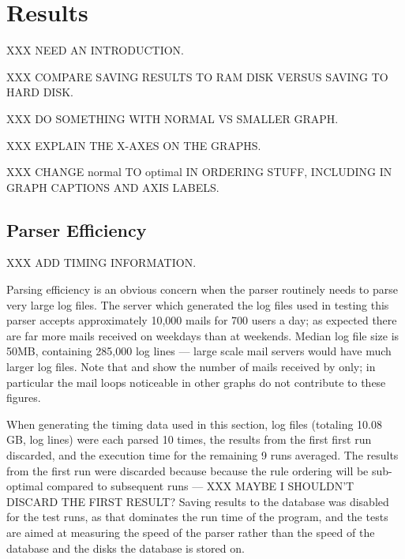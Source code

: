 \section{Results}

XXX NEED AN INTRODUCTION\@.

XXX COMPARE SAVING RESULTS TO RAM DISK VERSUS SAVING TO HARD DISK\@.

XXX DO SOMETHING WITH NORMAL VS SMALLER GRAPH\@.

XXX EXPLAIN THE X-AXES ON THE GRAPHS\@.

XXX CHANGE normal TO optimal IN ORDERING STUFF, INCLUDING IN GRAPH CAPTIONS
AND AXIS LABELS\@.

\subsection{Parser Efficiency}

\label{parser efficiency}

XXX ADD TIMING INFORMATION\@.

Parsing efficiency is an obvious concern when the parser routinely needs to
parse very large log files.  The server which generated the log files used
in testing this parser accepts approximately 10,000 mails for 700 users a
day; as expected there are far more mails received on weekdays than at
weekends.   Median log file size is 50MB, containing 285,000 log lines ---
large scale mail servers would have much larger log files.  Note that
 and  show the number of mails received by \SMTP{} only; in
particular the mail loops noticeable in other graphs do not contribute to
these figures.



When generating the timing data used in this section, \numberOFlogFILES{}
log files (totaling 10.08 GB, \numberOFlogLINEShuman{} log lines) were each
parsed 10 times, the results from the first first run discarded, and the
execution time for the remaining 9 runs averaged.  The results from the
first run were discarded because because the rule ordering will be
sub-optimal compared to subsequent runs --- XXX MAYBE I SHOULDN'T DISCARD
THE FIRST RESULT\@?  Saving results to the database was disabled for the
test runs, as that dominates the run time of the program, and the tests are
aimed at measuring the speed of the parser rather than the speed of the
database and the disks the database is stored on.


